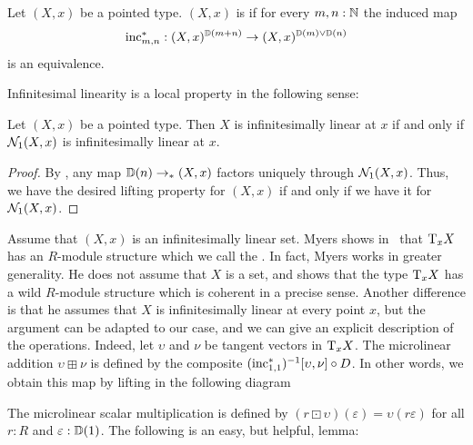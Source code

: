 \begin{definition}\label{def:inf-lin}
  Let $(X,x)$ be a pointed type.
  $(X,x)$ is  if for every $m, n : \N$ the induced map
  \begin{align*}
    \inc_{m,n}^* : (X,x)^{\D (m+n)} \rightarrow (X,x)^{\D(m) \vee \D(n)}
  \end{align*}
  is an equivalence.
\end{definition}

Infinitesimal linearity is a local property in the following sense:

\begin{proposition}\label{prp:inf-lin-hood}
  Let $(X,x)$ be a pointed type.
  Then $X$ is infinitesimally linear at $x$ if and only if $\hood{X,x}{1}$ is infinitesimally linear at $x$.
\end{proposition}

\begin{proof}
  By , any map $\D(n) \pto (X,x)$ factors uniquely through $\hood{X,x}{1}$.
  Thus, we have the desired lifting property for $(X,x)$ if and only if we have it for $\hood{X,x}{1}$.
\end{proof}

Assume that $(X,x)$ is an infinitesimally linear set.
Myers shows in~\cite[Lemma 4.2.19]{david-orbifolds} that $\tangent{X}{x}$ has an $R$-module structure which we call the .
In fact, Myers works in greater generality.  He does not assume that $X$ is a set, and shows that the type $\tangent{X}{x}$ has a wild $R$-module structure which is coherent in a precise sense.
Another difference is that he assumes that $X$ is infinitesimally linear at every point $x$, but the argument can be adapted to our case, and we can give an explicit description of the operations.
Indeed, let $\upsilon$ and $\nu$ be tangent vectors in $\tangent{X}{x}$.
The microlinear addition $\upsilon \boxplus \nu$ is defined by the composite $(\inc_{1,1}^\ast)^{-1}[\upsilon,\nu] \circ D$.
In other words, we obtain this map by lifting in the following diagram
\begin{center}
\end{center}
The microlinear scalar multiplication is defined by $(r \boxdot \upsilon)(\varepsilon) = \upsilon(r\varepsilon)$ for all $r : R$ and $\varepsilon : \D(1)$.
The following is an easy, but helpful, lemma:

